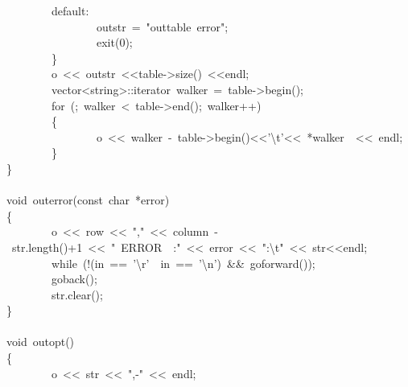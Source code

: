 \documentclass{article}
\begin{document}
\begin{mdpre}
~~~~~~~~{default}:\\
~~~~~~~~~~~~~~~~outstr~=~{"}{outtable~error}{"};\\
~~~~~~~~~~~~~~~~exit({0});\\
~~~~~~~~\}\\
~~~~~~~~o~\textless{}\textless{}~outstr~\textless{}\textless{}table-\textgreater{}size()~\textless{}\textless{}endl;\\
~~~~~~~~vector\textless{}string\textgreater{}::iterator~walker~=~table-\textgreater{}begin();\\
~~~~~~~~{for}~(;~walker~\textless{}~table-\textgreater{}end();~walker++)\\
~~~~~~~~\{~~~~~~~\\
~~~~~~~~~~~~~~~~o~\textless{}\textless{}~walker~-~table-\textgreater{}begin()\textless{}\textless{}{'}{\textbackslash{}t}{'}\textless{}\textless{}~*walker~~\textless{}\textless{}~endl;\\
~~~~~~~~\}\\
\}\\
\\
{void}~outerror({const}~{char}~*error)\\
\{\\
~~~~~~~~o~\textless{}\textless{}~row~\textless{}\textless{}~{"}{,}{"}~\textless{}\textless{}~column~-~str.length()+{1}~\textless{}\textless{}~{"}{~ERROR~~:}{"}~\textless{}\textless{}~error~\textless{}\textless{}~{"}{:}{\textbackslash{}t}{"}~\textless{}\textless{}~str\textless{}\textless{}endl;\\
~~~~~~~~{while}~(!(in~==~{'}{\textbackslash{}r}{'}~\textbar{}\textbar{}~in~==~{'}{\textbackslash{}n}{'})~\&\&~goforward());\\
~~~~~~~~goback();\\
~~~~~~~~str.clear();\\
\}\\
\\
{void}~outopt()\\
\{\\
~~~~~~~~o~\textless{}\textless{}~str~\textless{}\textless{}~{"}{,-}{"}~\textless{}\textless{}~endl;\\

\end{mdpre}
\end{document}

